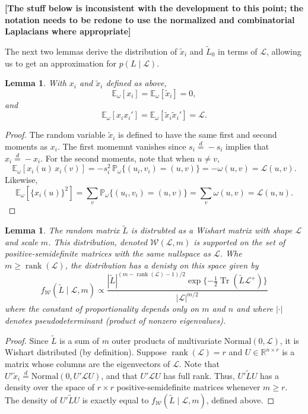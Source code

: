 \documentclass[12pt]{article}
\newcommand{\reals}{\mathbb{R}}
\DeclareMathOperator*{\Tr}{Tr}
\DeclareMathOperator*{\rank}{rank}
\newcommand{\prob}{\mathbb{P}}
\newcommand{\E}{\mathbb{E}}
\theoremstyle{plain}
\newtheorem{lemma}[theorem]{Lemma}
\begin{document}
\textbf{[The stuff below is inconsistent with the development to this point;
the notation needs to be redone to use the normalized and
combinatorial Laplacians where appropriate]}

\noindent
The next two lemmas derive the distribution of $\tilde x_i$ and
$\tilde L_0$ in terms of $\mathcal{L}$, allowing us to get an
approximation for $p(L \mid \mathcal{L})$.

\begin{lemma}
  With $x_i$ and $\tilde x_i$ defined as above,
  \[
    \E_\omega[ x_i ] = \E_\omega[ \tilde x_i ] = 0,
  \]
  and
  \[
    \E_\omega[ x_i x_i' ] = \E_\omega [ \tilde x_i \tilde x_i' ] = \mathcal{L}.
  \]
\end{lemma}
\begin{proof}
The random variable $\tilde x_i$ is defined to have the same first
and second moments as $x_i$.
The first momemnt vanishes since $s_i \overset{d}{=} -s_i$ implies
that $x_i \overset{d}{=} -x_i$.  For the second moments, note that
when $u \neq v$, 
\[
  \E_\omega[x_i(u) \, x_i(v)]
  = -s_i^2 \, \prob_\omega\{ (u_i,v_i) = (u,v) \}  = -\omega(u,v)
  = \mathcal{L}(u,v).
\]
Likewise,
\[
  \E_\omega[\{x_i(u)\}^2]
      = \sum_{v} \prob_\omega\{ (u_i,v_i) = (u,v) \}
      = \sum_{v} \omega(u,v)
      = \mathcal{L}(u,u).
\]
\end{proof}

\begin{lemma}\label{L:approx-wishart}
  The random matrix $\tilde L$ is distrubted as a Wishart matrix with
  shape $\mathcal{L}$ and scale $m$.  This distribution, denoted
  $\mathcal{W}(\mathcal{L}, m)$ is supported on the set of
  positive-semidefinite matrices with the same nullspace as $\mathcal{L}$.  Whe
  $m \geq \rank(\mathcal{L})$, the distribution has a denisty on this space
  given by
  \begin{equation}\label{E:wishart-density}
   f_\mathcal{W}( \tilde L \mid \mathcal{L}, m)
      \propto
      \frac{|\tilde L|^{(m - \rank(\mathcal{L}) - 1)/2}
        \exp\{-\tfrac{1}{2} \Tr(\tilde L \mathcal{L}^+) \}}
        {|\mathcal{L}|^{m/2}}
  \end{equation}
  where the constant of proportionality depends only on $m$ and $n$
  and where $|\cdot|$ denotes pseudodeterminant (product of nonzero
  eigenvalues).
\end{lemma}
\begin{proof}
  Since $\tilde L$ is a sum of $m$ outer products of multivariate
  $\mathrm{Normal}(0, \mathcal{L})$, it is Wishart distributed
  (by definition).
  Suppose $\rank(\mathcal{L}) = r$ and
  $U \in \reals^{n \times r}$ is a matrix whose columns are the
    eigenvectors of $\mathcal{L}$.  Note that
    $U' \tilde x_i \overset{d}{=} \mathrm{Normal}(0, U' \mathcal{L} U)$,
    and that $U' \mathcal{L} U$ has full rank.  Thus,
    \(
      U' \tilde L U
    \)
    has a density over the space of $r \times r$ positive-semidefinite
    matrices whenever $m \geq r$.  The density of $U' \tilde L U$ is
    exactly equal to $f_\mathcal{W}(\tilde L \mid \mathcal{L}, m)$,
    defined above.
\end{proof}
\end{document}
